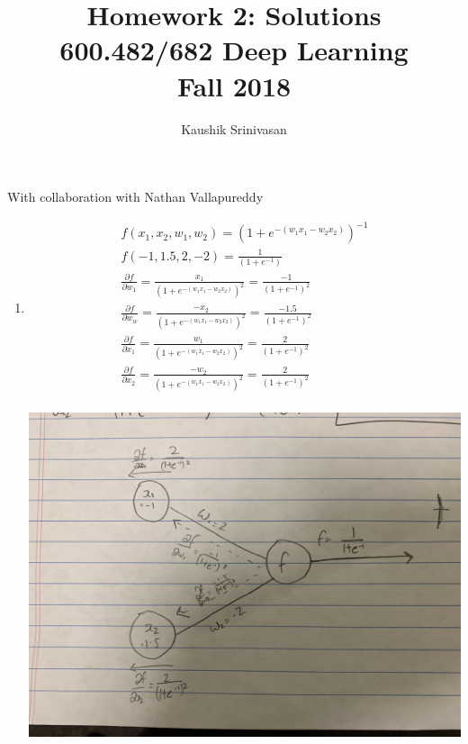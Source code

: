 \documentclass[a4paper]{article}
\title{Homework 2: Solutions\\
600.482/682 Deep Learning\\
Fall 2018}
\author{Kaushik Srinivasan}
\begin{document}
\maketitle
With collaboration with Nathan Vallapureddy

\vspace{5mm}
\begin{enumerate}
	\item 
	\begin{gather*}
		f(x_1, x_2, w_1, w_2) = (1 + e^{-(w_1x_1-w_2x_2)})^{-1}\\
		f(-1, 1.5, 2, -2) = \frac{1}{(1 + e^{-1})}\\
		\frac{\partial f}{\partial w_1} = \frac{x_1}{(1 + e^{-(w_1x_1-w_2x_2)})^{2}} = \frac{-1}{(1+e^{-1})^2}\\
		\frac{\partial f}{\partial w_w} = \frac{-x_2}{(1 + e^{-(w_1x_1-w_2x_2)})^{2}} = \frac{-1.5}{(1+e^{-1})^2}\\
		\frac{\partial f}{\partial x_1} = \frac{w_1}{(1 + e^{-(w_1x_1-w_2x_2)})^{2}} = \frac{2}{(1+e^{-1})^2}\\
		\frac{\partial f}{\partial x_2} = \frac{-w_2}{(1 + e^{-(w_1x_1-w_2x_2)})^{2}} = \frac{2}{(1+e^{-1})^2}\\
	\end{gather*}
	\begin{center}
	\includegraphics[scale=0.05]{IMG_0444}		
	\end{center}


\end{enumerate}
\end{document}
